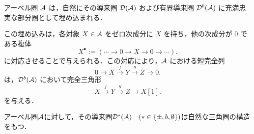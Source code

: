 \begin{prop}\cite{KS06}
アーベル圏 ${\mathcal A}$ は，自然にその導来圏 ${\mathcal D}({\mathcal A})$ および有界導来圏 ${\mathcal D}^b({\mathcal A})$ に充満忠実な部分圏として埋め込まれる．

この埋め込みは，各対象 $X \in {\mathcal A}$ をゼロ次成分に $X$ を持ち，他の次成分が $0$ である複体
\[
X^\bullet := (\cdots \to 0 \to X \to 0 \to \cdots).
\]
に対応させることで与えられる．この対応により，${\mathcal A}$ における短完全列
\[
0 \to X \xrightarrow{f} Y \xrightarrow{g} Z \to 0.
\]
は，${\mathcal D}^b({\mathcal A})$ において完全三角形
\[
X \xrightarrow{f} Y \xrightarrow{g} Z \to X[1].
\]
を与える．
\end{prop}

\begin{prop}\cite[p.320]{KS06}
	アーベル圏${\mathcal A}$に対して，その導来圏${\mathcal D}^*({\mathcal A})\quad (*\in \{\pm,b,\emptyset\})$は自然な三角圏の構造をもつ．
\end{prop}
